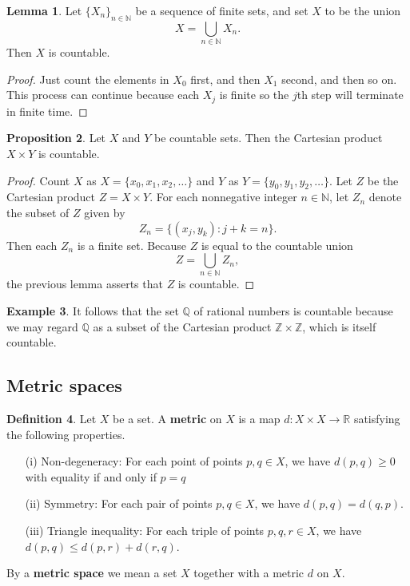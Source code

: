 \documentclass[12pt]{article}
\theoremstyle{definition}
\newtheorem{definition}{Definition}
\newtheorem{example}[definition]{Example}
\theoremstyle{theorem}
\newtheorem{proposition}[definition]{Proposition}
\newtheorem{lemma}[definition]{Lemma}
\begin{document}
\begin{lemma}
Let $\{X_n\}_{n \in \mathbb{N}}$ be a sequence of finite sets, and set $X$ to be the union 
\[
X = \bigcup_{n \in \mathbb{N}} X_n.
\] 
Then $X$ is countable. 
\end{lemma}

\begin{proof}
Just count the elements in $X_0$ first, and then $X_1$ second, and then so on. This process can continue because each $X_j$ is finite so the $j$th step will terminate in finite time. 
\end{proof}

\begin{proposition}
Let $X$ and $Y$ be countable sets. Then the Cartesian product $X \times Y$ is countable. 
\end{proposition}

\begin{proof}
Count $X$ as $X = \{x_0, x_1, x_2, \ldots\}$ and $Y$ as $Y = \{y_0, y_1, y_2, \ldots\}$. Let $Z$ be the Cartesian product $Z = X \times Y$. For each nonnegative integer $n \in \mathbb{N}$, let $Z_n$ denote the subset of $Z$ given by 
\[
Z_n = \{(x_j, y_k) : j + k = n\}.
\]
Then each $Z_n$ is a finite set. Because $Z$ is equal to the countable union 
\[
Z = \bigcup_{n \in \mathbb{N}}Z_n,
\]
the previous lemma asserts that $Z$ is countable. 
\end{proof}

\begin{example}
It follows that the set $\mathbb{Q}$ of rational numbers is countable because we may regard $\mathbb{Q}$ as a subset of the Cartesian product $\mathbb{Z} \times \mathbb{Z}$, which is itself countable. 
\end{example}

\subsection{Metric spaces}

\begin{definition}
Let $X$ be a set. A \textbf{metric} on $X$ is a map $d : X \times X \to \mathbb{R}$ satisfying the following properties. 
\begin{enumerate}
\item[(i)] Non-degeneracy: For each point of points $p,q \in X$, we have $d(p,q) \geqslant 0$ with equality if and only if $p = q$
\item[(ii)] Symmetry: For each pair of points $p,q \in X$, we have $d(p,q) = d(q,p)$.
\item[(iii)] Triangle inequality: For each triple of points $p,q,r \in X$, we have $d(p,q) \leqslant d(p,r) + d(r,q)$. 
\end{enumerate}
By a \textbf{metric space} we mean a set $X$ together with a metric $d$ on $X$. 
\end{definition}
\end{document}
